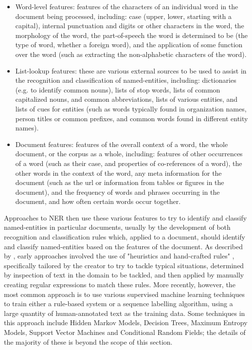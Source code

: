 \documentclass[12pt, a4paper]{report}
\begin{document}
\begin{itemize}
	\item {Word-level features: features of the characters of an individual word in the document being processed, including: case (upper, lower, starting with a capital), internal punctuation and digits or other characters in the word, the morphology of the word, the part-of-speech the word is determined to be (the type of word, whether a foreign word), and the application of some function over the word (such as extracting the non-alphabetic characters of the word).}
	\item {List-lookup features: these are various external sources to be used to assist in the recognition and classification of named-entities, including: dictionaries (e.g. to identify common nouns), lists of stop words, lists of common capitalized nouns, and common abbreviations, lists of various entities, and lists of cues for entities (such as words typically found in organization names, person titles or common prefixes, and common words found in different entity names).}
	\item {Document features: features of the overall context of a word, the whole document, or the corpus as a whole, including: features of other occurrences of a word (such as their case, and properties of co-references of a word), the other words in the context of the word, any meta information for the document (such as the url or information from tables or figures in the document), and the frequency of words and phrases occurring in the document, and how often certain words occur together.}
\end{itemize}

Approaches to NER then use these various features to try to identify and classify named-entities in particular documents, usually by the  development of both recognition and classification rules which, applied to a document, should identify and classify named-entities based on the features of the document. As described by \citet{nadeau2009}, early approaches involved the use of "heuristics and hand-crafted rules" \citet[p.~2]{nadeau2009}, specifically tailored by the creator to try to tackle typical situations, determined by inspection of text in the domain to be tackled, and then applied by manually creating regular expressions to match these rules. More recently, however, the most common approach is to use various supervised machine learning techniques to train either a rule-based system or a sequence labelling algorithm, using a large quantity of human-annotated text as the training data. Some techniques in this approach include Hidden Markov Models, Decision Trees, Maximum Entropy Models, Support Vector Machines and Conditional Random Fields; the details of the majority of these is beyond the scope of this section.
\end{document}
